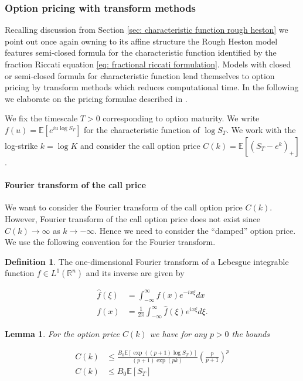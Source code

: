 \documentclass[12pt,twoside]{article}
\theoremstyle{plain}
\theoremstyle{plain}
\newtheorem{lemma}[proposition]{Lemma}
\theoremstyle{definition}
\newtheorem{definition}[proposition]{Definition}
\theoremstyle{remark}
\numberwithin{equation}{section}
\begin{document}
\subsubsection{Option pricing with transform methods}
\label{sec: option pricing with transform methods}

Recalling discussion from Section \ref{sec: characteristic function rough heston} we point out once again owning to its affine structure the Rough Heston model features semi-closed formula for the characteristic function identified by the fraction Riccati equation \eqref{eq: fractional riccati formulation}. Models with closed or semi-closed formula for characteristic function lend themselves to option pricing by transform methods which reduces computational time. In the following we elaborate on the pricing formulae described in \cite{CM99}.

We fix the timescale $T>0$ corresponding to option maturity. We write $f(u) = \mathbb E \left[ e^{iu \log S_T}\right]$ for the characteristic function of $\log S_T$. We work with the log-strike $k=\log K$ and consider the call option price $C(k) = \mathbb E \left[ (S_T - e^k)_+ \right]$. 

\paragraph{Fourier transform of the call price}

We want to consider the Fourier transform of the call option price $C(k)$. However, Fourier transform of the call option price does not exist since $C(k)\rightarrow \infty$ as $k\rightarrow -\infty$. Hence we need to consider the ``damped'' option price. We use the following convention for the Fourier transform.

\begin{definition}

The one-dimensional Fourier transform of a Lebesgue integrable function $f \in L^{1}\left(\mathbb{R}^{n}\right)$ and its inverse are given by

$$
\begin{aligned}
\hat{f}(\xi)&=\int_{-\infty}^{\infty} f(x) e^{-i x \xi} d x \\[10pt]
f(x)&=\frac{1}{2\pi}\int_{-\infty}^{\infty} \hat{f}(\xi) e^{i x \xi} d \xi.
\end{aligned}
$$

\end{definition}

\begin{lemma}

For the option price $C(k)$ we have for any $p>0$ the bounds

\begin{equation}
\label{eq: call price bounds}
\begin{aligned}
C(k) &\leqslant \frac{B_{0} \mathbb{E} \left[\exp ((p+1) \log S_T)\right]}{(p+1) \exp (p k)}\left(\frac{p}{p+1}\right)^{p} \\[10pt]
C(k) & \leqslant B_{0} \mathbb{E}\left[ S_T\right]
\end{aligned}
\end{equation}

\end{lemma}
\end{document}
